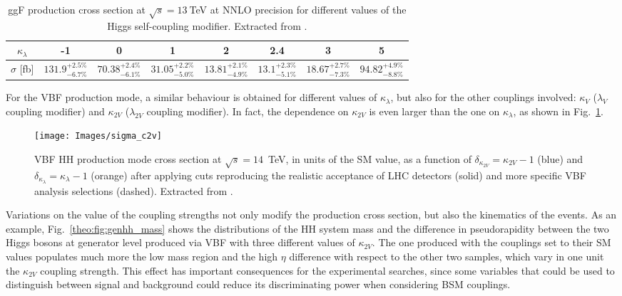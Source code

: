 \documentclass[../main.tex]{subfiles}
\begin{document}
\begin{table}[h!]
\begin{center}
\begin{footnotesize}
\begin{tabular}{c | c | c | c | c | c | c | c}
$\kappa_\lambda$ & -1 & 0 & 1 & 2 & 2.4 & 3 & 5 \\\hline\hline
$\sigma$ [fb] & $131.9^{+2.5\%}_{-6.7\%}$ & $70.38^{+2.4\%}_{-6.1\%}$ & $31.05^{+2.2\%}_{-5.0\%} $ & $13.81^{+2.1\%}_{-4.9\%}$ & $13.1^{+2.3\%}_{-5.1\%}$ & $18.67^{+2.7\%}_{-7.3\%}$ & $94.82^{+4.9\%}_{-8.8\%}$
\end{tabular}
\end{footnotesize}
\end{center}
\caption{ggF production cross section at $\sqrt{s}=13~$TeV at NNLO precision for different values of the Higgs self-coupling modifier. Extracted from \cite{intro:theo:les_houches}.}
\label{theo:tab:ggf_kl_dependence}
\end{table}

For the VBF production mode, a similar behaviour is obtained for different values of $\kappa_\lambda$, but also for the other couplings involved: $\kappa_V$ ($\lambda_V$ coupling modifier) and $\kappa_{2V}$ ($\lambda_{2V}$ coupling modifier). In fact, the dependence on $\kappa_{2V}$ is even larger than the one on $\kappa_\lambda$, as shown in Fig.~\ref{theo:fig:vbf_k2v_kl}.


\begin{figure}[h!]
\begin{center}
\texttt{[image: Images/sigma\_c2v]}
\end{center}
\caption{VBF HH production mode cross section at $\sqrt{s}=14$~TeV, in units of the SM value, as a function of $\delta_{\kappa_{2V}} = \kappa_{2V} - 1$ (blue) and $\delta_{\kappa_\lambda} = \kappa_\lambda - 1$ (orange) after applying cuts reproducing the realistic acceptance of LHC detectors (solid) and more specific VBF analysis selections (dashed). Extracted from \cite{intro:theo:c2v}.}
\label{theo:fig:vbf_k2v_kl}
\end{figure}

Variations on the value of the coupling strengths not only modify the production cross section, but also the kinematics of the events. As an example, Fig.~\ref{theo:fig:genhh_mass} shows the distributions of the HH system mass and the difference in pseudorapidity between the two Higgs bosons at generator level produced via VBF with three different values of $\kappa_{2V}$. The one produced with the couplings set to their SM values populates much more the low mass region and the high $\eta$ difference with respect to the other two samples, which vary in one unit the $\kappa_{2V}$ coupling strength. This effect has important consequences for the experimental searches, since some variables that could be used to distinguish between signal and background could reduce its discriminating power when considering BSM couplings.
\end{document}
